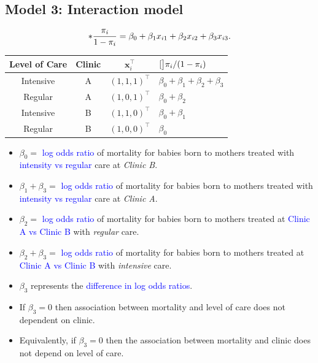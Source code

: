 \documentclass{article}\usepackage[]{graphicx}\usepackage[svgnames]{xcolor}
\let\log\relax%
\providecommand{\Vector}[1]{\bm{#1}}%
\begin{document}
\subsection*{Model 3: Interaction model}
\[ \log*{\frac{\pi_i}{1-\pi_i}}=\beta_0+\beta_1x_{i1}+\beta_2x_{i2}+\beta_3x_{i3}. \]
\begin{table}[!htbp]
      \centering
      \begin{tabular}{cccl}
            Level of Care & Clinic & $ \Vector{x}_i^\top $ & $ \log[\big]{\pi_i/(1-\pi_i)} $     \\
            \midrule
            Intensive     & A      & $ (1,1,1)^\top $      & $ \beta_0+\beta_1+\beta_2+\beta_3 $ \\
            Regular       & A      & $ (1,0,1)^\top $      & $ \beta_0+\beta_2 $                 \\
            Intensive     & B      & $ (1,1,0)^\top $      & $ \beta_0+\beta_1 $                 \\
            Regular       & B      & $ (1,0,0)^\top $      & $ \beta_0 $                         \\
            \bottomrule
      \end{tabular}
\end{table}
\begin{itemize}
      \item $ \beta_0= $ \textcolor{Blue}{log odds ratio} of mortality for babies born to mothers treated with
            \textcolor{Blue}{intensity vs regular} care at \emph{Clinic B}.
      \item $ \beta_1+\beta_3= $ \textcolor{Blue}{log odds ratio} of mortality for babies born to mothers treated
            with \textcolor{Blue}{intensity vs regular} care at \emph{Clinic A}.
      \item $ \beta_2= $ \textcolor{Blue}{log odds ratio} of mortality for babies born to mothers treated at
            \textcolor{Blue}{Clinic A vs Clinic B} with \emph{regular} care.
      \item $ \beta_2+\beta_3= $ \textcolor{Blue}{log odds ratio} of mortality for babies born to mothers treated at
            \textcolor{Blue}{Clinic A vs Clinic B} with \emph{intensive} care.
      \item $ \beta_3 $ represents the \textcolor{Blue}{difference in log odds ratios}.
      \item If $ \beta_3=0 $ then association between mortality and level of care does not
            dependent on clinic.
      \item Equivalently, if $ \beta_3=0 $ then the association between mortality and clinic
            does not depend on level of care.
\end{itemize}
\end{document}
